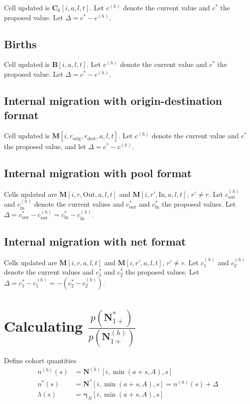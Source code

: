 \documentclass{article}
\begin{document}
Cell updated is $\bm{C}_k[i, a, l, t]$.  Let $c^{(h)}$ denote the current value and $c^*$ the proposed value.  Let $\Delta = c^* - c^{(h)}$.

\subsection{Births}

Cell updated is $\bm{B}[i, a, l, t]$.  Let $c^{(h)}$ denote the current value and $c^*$ the proposed value.  Let $\Delta = c^* - c^{(h)}$.

\subsection{Internal migration with origin-destination format}

Cell updated is $\bm{M}[i, r_{\text{orig}}, r_{\text{dest}}, a, l, t]$.  Let $c^{(h)}$ denote the current value and $c^*$ the proposed value, and let $\Delta = c^* - c^{(h)}$.

\subsection{Internal migration with pool format}
 
Cells updated are $\bm{M}[i, r, \text{Out}, a, l, t]$ and $\bm{M}[i, r', \text{In}, a, l, t]$, $r' \neq r$.    Let $c_{\text{out}}^{(h)}$ and $c_{\text{in}}^{(h)}$ denote the current values and $c_{\text{out}}^*$ and $c_{\text{in}}^*$ the proposed values. Let $\Delta = c_{\text{out}}^* - c_{\text{out}}^{(h)} = c_{\text{in}}^* - c_{\text{in}}^{(h)}$.

\subsection{Internal migration with net format}

Cells updated are $\bm{M}[i, r, a, l, t]$ and $\bm{M}[i, r', a, l, t]$, $r' \neq r$.   Let $c_1^{(h)}$ and $c_2^{(h)}$ denote the current values and $c_1^*$ and $c_2^*$ the proposed values.  Let $\Delta = c_1^* - c_1^{(h)} = -(c_2^* - c_2^{(h)})$.



\section{Calculating $\frac{ p(\bm{N}_{1+}^*) }{ p(\bm{N}_{1+}^{(h)}) }$ }

Define cohort quantities
\begin{align}
  n^{(h)}(s) & = \bm{N}^{(h)}[i, \min(a + s, A), s] \\
  n^*(s) & = \bm{N}^*[i, \min(a + s, A), s]  = n^{(h)}(s) + \Delta \\
  \lambda(s) & = \bm{\gamma}_N[i, \min(a + s, A), s]
\end{align}
\end{document}
